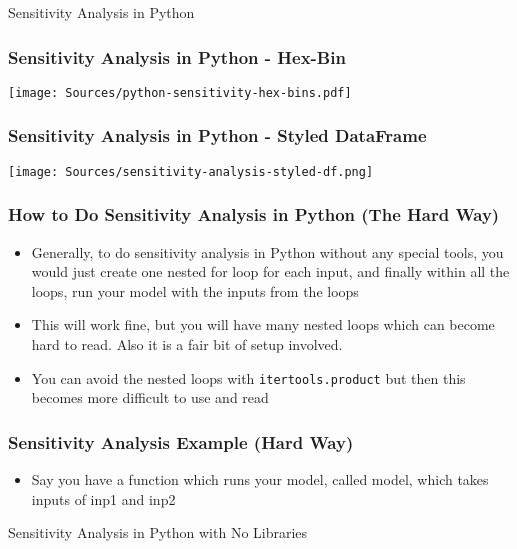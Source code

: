 \documentclass[handout, 11pt]{beamer}
\begin{document}
\begin{section}[SA Python]{Sensitivity Analysis in Python}
\begin{frame}
\frametitle{Sensitivity Analysis in Python - Hex-Bin}
\begin{center}
\begin{adjustbox}{width=0.9\textwidth, height=0.8\textheight, keepaspectratio}
\texttt{[image: Sources/python-sensitivity-hex-bins.pdf]}
\end{adjustbox}
\end{center}
\end{frame}
\begin{frame}
\frametitle{Sensitivity Analysis in Python - Styled DataFrame}
\begin{center}
\begin{adjustbox}{width=0.9\textwidth, height=0.8\textheight, keepaspectratio}
\texttt{[image: Sources/sensitivity-analysis-styled-df.png]}
\end{adjustbox}
\end{center}
\end{frame}
\begin{frame}
\frametitle{How to Do Sensitivity Analysis in Python (The Hard Way)}
\begin{itemize}
\item Generally, to do sensitivity analysis in Python without any special tools, you would just create one nested for loop for each input, and finally within all the loops, run your model with the inputs from the loops
\vfill
\item This will work fine, but you will have many nested loops which can become hard to read. Also it is a fair bit of setup involved.
\vfill
\item You can avoid the nested loops with
\texttt{itertools.product}
but then this becomes more difficult to use and read
\end{itemize}
\end{frame}
\begin{frame}[fragile]
\frametitle{Sensitivity Analysis Example (Hard Way)}
\scriptsize
\begin{itemize}
\item Say you have a function which runs your model, called model, which takes inputs of inp1 and inp2
\end{itemize}
\begin{block}{Sensitivity Analysis in Python with No Libraries}
\begin{verbatim}


\end{verbatim}
\end{block}
\end{frame}
\end{section}
\end{document}
